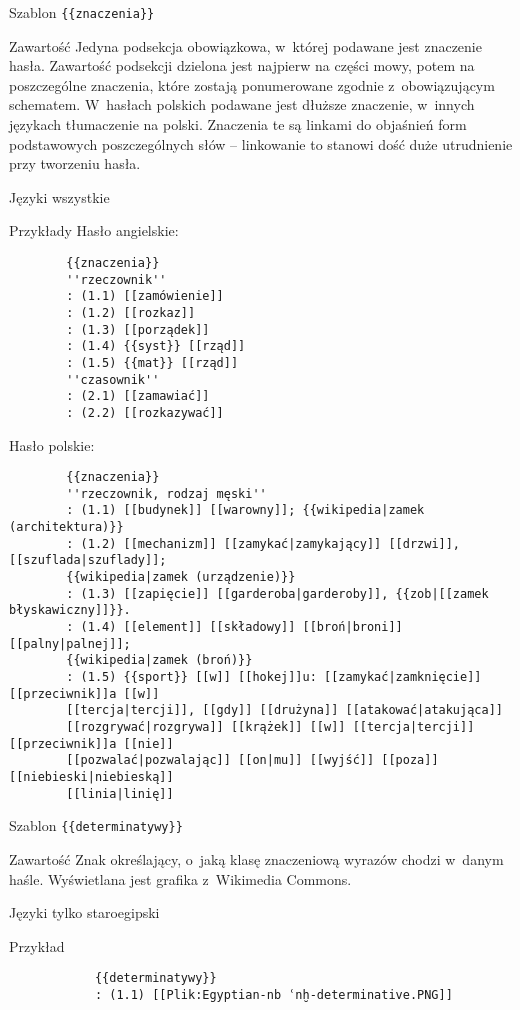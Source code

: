 \begin{opis}
	\item[Szablon] \verb|{{znaczenia}}|
	\item[Zawartość] Jedyna podsekcja obowiązkowa, w~której podawane jest znaczenie hasła. Zawartość podsekcji dzielona jest najpierw na części mowy, potem na poszczególne znaczenia, które zostają ponumerowane zgodnie z~obowiązującym schematem. W~hasłach polskich podawane jest dłuższe znaczenie, w~innych językach tłumaczenie na polski. Znaczenia te są linkami do objaśnień form podstawowych poszczególnych słów -- linkowanie to stanowi dość duże utrudnienie przy tworzeniu hasła.
	\item[Języki] wszystkie
	\item[Przykłady] Hasło angielskie:
		\begin{verbatim}
		{{znaczenia}}
		''rzeczownik''
		: (1.1) [[zamówienie]]
		: (1.2) [[rozkaz]]
		: (1.3) [[porządek]]
		: (1.4) {{syst}} [[rząd]]
		: (1.5) {{mat}} [[rząd]]
		''czasownik''
		: (2.1) [[zamawiać]]
		: (2.2) [[rozkazywać]]
		\end{verbatim}
		Hasło polskie:
		\begin{verbatim}
		{{znaczenia}}
		''rzeczownik, rodzaj męski''
		: (1.1) [[budynek]] [[warowny]]; {{wikipedia|zamek (architektura)}}
		: (1.2) [[mechanizm]] [[zamykać|zamykający]] [[drzwi]], [[szuflada|szuflady]];
		{{wikipedia|zamek (urządzenie)}}
		: (1.3) [[zapięcie]] [[garderoba|garderoby]], {{zob|[[zamek błyskawiczny]]}}.
		: (1.4) [[element]] [[składowy]] [[broń|broni]] [[palny|palnej]];
		{{wikipedia|zamek (broń)}}
		: (1.5) {{sport}} [[w]] [[hokej]]u: [[zamykać|zamknięcie]] [[przeciwnik]]a [[w]]
		[[tercja|tercji]], [[gdy]] [[drużyna]] [[atakować|atakująca]]
		[[rozgrywać|rozgrywa]] [[krążek]] [[w]] [[tercja|tercji]] [[przeciwnik]]a [[nie]]
		[[pozwalać|pozwalając]] [[on|mu]] [[wyjść]] [[poza]] [[niebieski|niebieską]]
		[[linia|linię]]
		\end{verbatim}
\end{opis}
\spacer
\begin{opis}
	\item[Szablon] \verb|{{determinatywy}}|
	\item[Zawartość] Znak określający, o~jaką klasę znaczeniową wyrazów chodzi w~danym haśle. Wyświetlana jest grafika z~Wikimedia Commons.
	\item[Języki] tylko staroegipski
	\item[Przykład]
		\begin{verbatim}
			{{determinatywy}}
			: (1.1) [[Plik:Egyptian-nb ʿnḫ-determinative.PNG]]
		\end{verbatim}
\end{opis}
